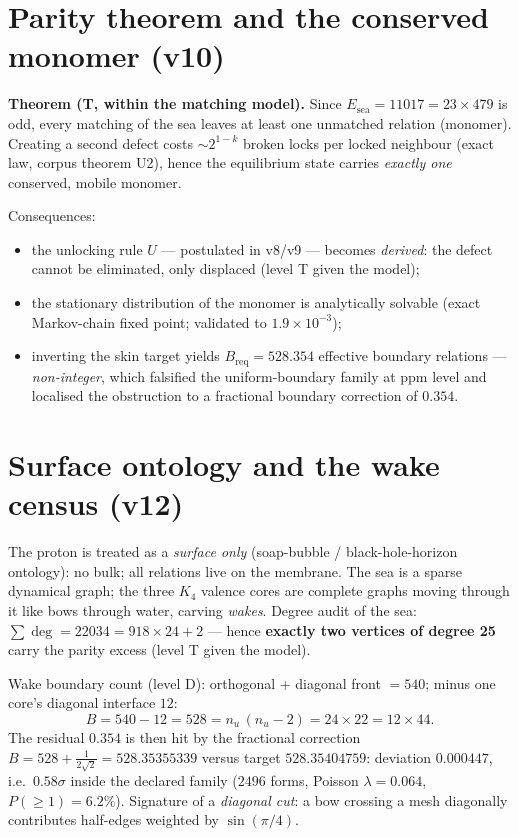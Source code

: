 \documentclass[11pt,a4paper]{article}
\newcommand{\Esea}{E_{\mathrm{sea}}}
\begin{document}
\section{Parity theorem and the conserved monomer (v10)}
\textbf{Theorem (T, within the matching model).} Since $\Esea = 11017 = 23\times 479$ is odd, every matching of the sea leaves at least one unmatched relation (monomer). Creating a second defect costs $\sim 2^{1-k}$ broken locks per locked neighbour (exact law, corpus theorem U2), hence the equilibrium state carries \emph{exactly one} conserved, mobile monomer.
\par\noindent Consequences:
\begin{itemize}[leftmargin=1.6em]
\item the unlocking rule $U$ --- postulated in v8/v9 --- becomes \emph{derived}: the defect cannot be eliminated, only displaced (level T given the model);
\item the stationary distribution of the monomer is analytically solvable (exact Markov-chain fixed point; validated to $1.9\times10^{-3}$);
\item inverting the skin target yields $B_{\mathrm{req}} = 528.354$ effective boundary relations --- \emph{non-integer}, which falsified the uniform-boundary family at ppm level and localised the obstruction to a fractional boundary correction of $0.354$.
\end{itemize}

\section{Surface ontology and the wake census (v12)}
The proton is treated as a \emph{surface only} (soap-bubble / black-hole-horizon ontology): no bulk; all relations live on the membrane. The sea is a sparse dynamical graph; the three $K_4$ valence cores are complete graphs moving through it like bows through water, carving \emph{wakes}. Degree audit of the sea: $\sum \deg = 22034 = 918\times 24 + 2$ --- hence \textbf{exactly two vertices of degree 25} carry the parity excess (level T given the model).
\par\noindent Wake boundary count (level D): orthogonal + diagonal front $= 540$; minus one core's diagonal interface $12$:
\[
B = 540 - 12 = 528 = n_u\,(n_u-2) = 24\times 22 = 12\times 44 .
\]
The residual $0.354$ is then hit by the fractional correction $B = 528 + \tfrac{1}{2\sqrt{2}} = 528.35355339$ versus target $528.35404759$: deviation $0.000447$, i.e.\ $0.58\sigma$ inside the declared family ($2496$ forms, Poisson $\lambda = 0.064$, $P(\geq 1) = 6.2\%$). Signature of a \emph{diagonal cut}: a bow crossing a mesh diagonally contributes half-edges weighted by $\sin(\pi/4)$.
\end{document}
